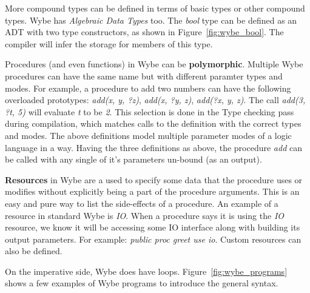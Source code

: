 More compound types can be defined in terms of basic types or other compound
types. Wybe has \textit{Algebraic Data Types} too. The \textit{bool} type can
be defined as an ADT with two type constructors, as shown in
Figure~\ref{fig:wybe_bool}. The compiler will infer the storage for members of
this type. 

Procedures (and even functions) in Wybe can be \textbf{polymorphic}. Multiple
Wybe procedures can have the same name but with different paramter types and
modes. For example, a procedure to add two numbers can have the following
overloaded prototypes: \textit{add(x, y, ?z)}, \textit{add(x, ?y, z)},
\textit{add(?x, y, z)}. The call \textit{add(3, ?t, 5)} will evaluate
\textit{t} to be \textit{2}. This selection is done in the Type checking pass
during compilation, which matches calls to the definition with the correct
types and modes. The above definitions model multiple parameter modes of a
logic language in a way. Having the three definitions as above, the procedure
\textit{add} can be called with any single of it's parameters un-bound (as an
output).

\textbf{Resources} in Wybe are a used to specify some data that the procedure
uses or modifies without explicitly being a part of the procedure
arguments. This is an easy and pure way to list the side-effects of a
procedure. An example of a resource in standard Wybe is \textit{IO}. When a
procedure says it is using the \textit{IO} resource, we know it will be
accessing some IO interface along with building its output parameters. For
example: \textit{public proc greet use io}. Custom resources can also be
defined.




On the imperative side, Wybe does have loops. Figure~\ref{fig:wybe_programs}
shows a few examples of Wybe programs to introduce the general syntax.




